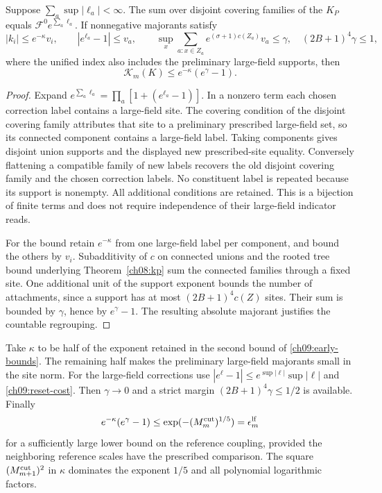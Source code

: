 \begin{proposition}
\label{ch09:fusion-prop}
Suppose $\sum_a\sup|\ell_a|<\infty$. The sum over disjoint covering families of
the $K_P$ equals $\mathcal F^0 e^{\sum_a\ell_a}$.
If nonnegative majorants satisfy
\[
 |k_i|\le e^{-\kappa}v_i,\qquad
 |e^{\ell_a}-1|\le v_a,\qquad
 \sup_x\sum_{a:x\in Z_a}e^{(\sigma+1)c(Z_a)}v_a\le\gamma,
 \quad (2B+1)^4\gamma\le1,
\]
where the unified index also includes the preliminary
large-field supports, then
\[
               \mathcal K_m(K)\le e^{-\kappa}(e^\gamma-1).
\]
\end{proposition}

\begin{proof}
Expand $e^{\sum_a\ell_a}=\prod_a[1+(e^{\ell_a}-1)]$.
In a nonzero term each chosen correction label contains
a large-field site. The covering condition of the disjoint covering family attributes that site to a preliminary
prescribed large-field set, so its connected component contains
a large-field label. Taking components gives disjoint union
supports and the displayed new prescribed-site equality.
Conversely flattening a compatible family of new labels
recovers the old disjoint covering family and the chosen correction labels.
No constituent label is repeated because its support is
nonempty. All additional conditions are retained. This is a bijection
of finite terms and does not require independence of their
large-field indicator reads.

For the bound retain $e^{-\kappa}$ from one large-field
label per component, and bound the others by $v_i$.
Subadditivity of $c$ on connected unions and the rooted
tree bound underlying Theorem~\ref{ch08:kp} sum the
connected families through a fixed site. One additional unit of the support exponent bounds the number of attachments, since a support has at most
$(2B+1)^4c(Z)$ sites. Their sum is bounded by
$\gamma$, hence by $e^\gamma-1$.
The resulting absolute majorant justifies the countable
regrouping.
\end{proof}

Take $\kappa$ to be half of the exponent retained in the
second bound of \eqref{ch09:early-bounds}.
The remaining half makes the preliminary large-field
majorants small in the site norm.
For the large-field corrections use
$|e^\ell-1|\le e^{\sup|\ell|}\sup|\ell|$ and
\eqref{ch09:reset-cost}.
Then $\gamma\to0$ and a strict margin
$(2B+1)^4\gamma\le1/2$ is available.
Finally
\[
 e^{-\kappa}(e^\gamma-1)
       \le \exp(-(M_m^{\rm cut})^{1/5})
             =\epsilon_m^{\rm lf}
\]
for a sufficiently large lower bound on the reference coupling, provided the
neighboring reference scales have the prescribed comparison.
The square $(M_{m+1}^{\rm cut})^2$ in $\kappa$ dominates
the exponent $1/5$ and all polynomial logarithmic factors.

